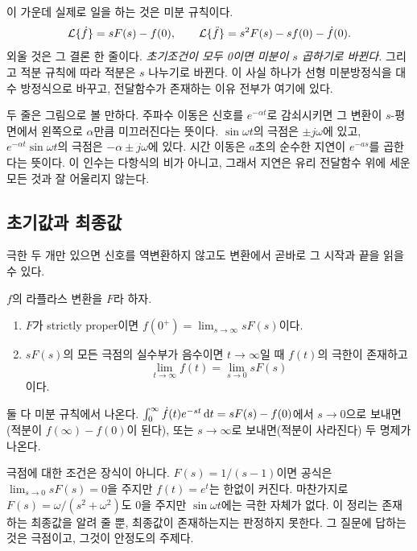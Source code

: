 \documentclass[11pt]{article}
\begin{document}
이 가운데 실제로 일을 하는 것은 미분 규칙이다.
\begin{equation}\label{eq:diffrule}
   \mathcal{L}\{\dot f\} = sF(s) - f(0),
   \qquad
   \mathcal{L}\{\ddot f\} = s^{2}F(s) - s f(0) - \dot f(0).
\end{equation}
외울 것은 그 결론 한 줄이다. \emph{초기조건이 모두 0이면 미분이 $s$ 곱하기로
바뀐다.} 그리고 적분 규칙에 따라 적분은 $s$ 나누기로 바뀐다. 이 사실 하나가
선형 미분방정식을 대수 방정식으로 바꾸고, 전달함수가 존재하는 이유 전부가
여기에 있다.

\begin{remark}[표 읽기]
두 줄은 그림으로 볼 만하다. 주파수 이동은 신호를 $e^{-\alpha t}$로 감쇠시키면
그 변환이 $s$-평면에서 왼쪽으로 $\alpha$만큼 미끄러진다는 뜻이다.
$\sin\omega t$의 극점은 $\pm j\omega$에 있고, $e^{-\alpha t}\sin\omega t$의
극점은 $-\alpha\pm j\omega$에 있다. 시간 이동은 $a$초의 순수한 지연이
$e^{-as}$를 곱한다는 뜻이다. 이 인수는 다항식의 비가 아니고, 그래서 지연은
유리 전달함수 위에 세운 모든 것과 잘 어울리지 않는다.
\end{remark}

\subsection{초기값과 최종값}\label{sec:fvt}
극한 두 개만 있으면 신호를 역변환하지 않고도 변환에서 곧바로 그 시작과 끝을
읽을 수 있다.

\begin{proposition}\label{prop:fvt}
$f$의 라플라스 변환을 $F$라 하자.
\begin{enumerate}[label=(\roman*),itemsep=2pt]
\item $F$가 strictly proper이면 $f(0^{+}) = \lim_{s\to\infty} sF(s)$이다.
\item $sF(s)$의 모든 극점의 실수부가 음수이면 $t\to\infty$일 때 $f(t)$의 극한이
존재하고
\[
   \lim_{t\to\infty} f(t) = \lim_{s\to 0} sF(s)
\]
이다.
\end{enumerate}
\end{proposition}

둘 다 미분 규칙에서 나온다. $\int_{0}^{\infty}\dot f(t)e^{-st}\,\mathrm{d} t
= sF(s)-f(0)$에서 $s\to0$으로 보내면(적분이 $f(\infty)-f(0)$이 된다), 또는
$s\to\infty$로 보내면(적분이 사라진다) 두 명제가 나온다.

\begin{caution}
극점에 대한 조건은 장식이 아니다. $F(s)=1/(s-1)$이면 공식은
$\lim_{s\to0}sF(s)=0$을 주지만 $f(t)=e^{t}$는 한없이 커진다. 마찬가지로
$F(s)=\omega/(s^{2}+\omega^{2})$도 $0$을 주지만 $\sin\omega t$에는 극한 자체가
없다. 이 정리는 존재하는 최종값을 알려 줄 뿐, 최종값이 존재하는지는 판정하지
못한다. 그 질문에 답하는 것은 극점이고, 그것이 안정도의 주제다.
\end{caution}
\end{document}
